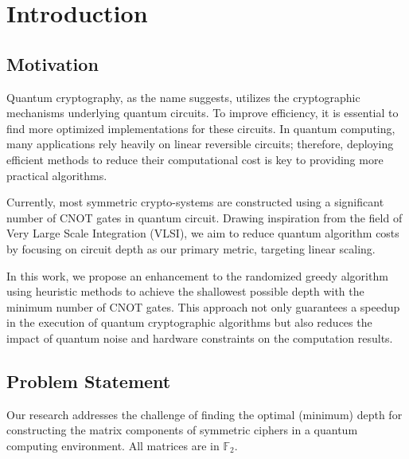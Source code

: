 \chapter{Introduction}

\section{Motivation}
Quantum cryptography, as the name suggests, utilizes the cryptographic mechanisms underlying quantum circuits. To improve efficiency, it is essential to find more optimized implementations for these circuits. In quantum computing, many applications rely heavily on linear reversible circuits; therefore, deploying efficient methods to reduce their computational cost is key to providing more practical algorithms.

Currently, most symmetric crypto-systems are constructed using a significant number of CNOT gates in quantum circuit. Drawing inspiration from the field of Very Large Scale Integration (VLSI), we aim to reduce quantum algorithm costs by focusing on circuit depth as our primary metric, targeting linear scaling.

In this work, we propose an enhancement to the randomized greedy algorithm using heuristic methods to achieve the shallowest possible depth with the minimum number of CNOT gates. This approach not only guarantees a speedup in the execution of quantum cryptographic algorithms but also reduces the impact of quantum noise and hardware constraints on the computation results.

\section{Problem Statement}
Our research addresses the challenge of finding the optimal (minimum) depth for constructing the matrix components of symmetric ciphers in a quantum computing environment. All matrices are in $\mathbb{F}_{2}$.